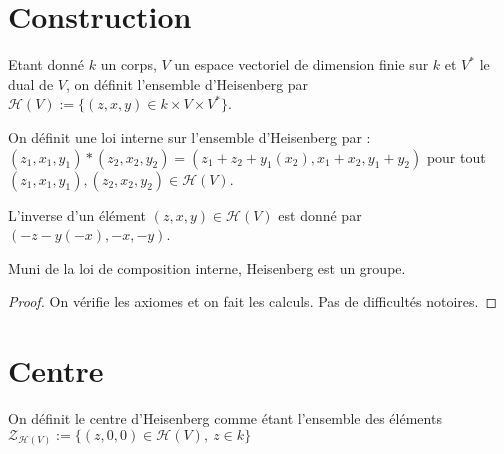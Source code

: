 \section{Construction}

\begin{definition}
    \label{def:heisenberg}
    \leanok

    Etant donné $k$ un corps, $V$ un espace vectoriel de dimension finie sur
    $k$ et $V^*$ le dual de $V$, on définit l'ensemble d'Heisenberg par 
    $\mathcal{H}(V):=\{(z,x,y) \in k\times V\times V^*\}$.
\end{definition}

\begin{definition}
    \label{def:mul_H}
    \leanok 

    On définit une loi interne sur l'ensemble d'Heisenberg par :
    $(z_1,x_1,y_1)*(z_2,x_2,y_2) = (z_1+z_2+y_1(x_2),x_1+x_2,y_1+y_2)$ pour
    tout $(z_1,x_1,y_1),(z_2,x_2,y_2)\in\mathcal{H}(V)$.
\end{definition}

\begin{definition}
    \label{def:inv_H}
    \leanok 

    L'inverse d'un élément $(z,x,y)\in\mathcal{H}(V)$ est donné par 
    $(-z- y(-x), - x ,- y)$.
\end{definition}

\begin{proposition}
    \label{prop:group_H}
    \leanok
    Muni de la loi de composition interne, Heisenberg est un groupe.
    \begin{proof}
        On vérifie les axiomes et on fait les calculs. Pas de difficultés
        notoires.
    \end{proof}
\end{proposition}

\section{Centre}

\begin{definition}
    \label{def:center_H}
    \leanok 

    On définit le centre d'Heisenberg comme étant l'ensemble des éléments
    $\mathcal{Z}_{\mathcal{H}(V)}:=\{(z,0,0)\in\mathcal{H}(V),\ z\in k\}$
\end{definition}

